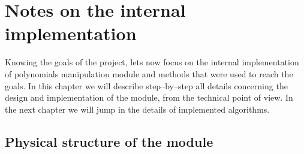 \chapter{Notes on the internal implementation}\label{thesis-internals}

Knowing the goals of the project, lets now focus on the internal implementation of polynomials
manipulation module and methods that were used to reach the goals. In this chapter we will describe
step--by--step all details concerning the design and implementation of the module, from the technical
point of view. In the next chapter we will jump in the details of implemented algorithms.


\section{Physical structure of the module}


